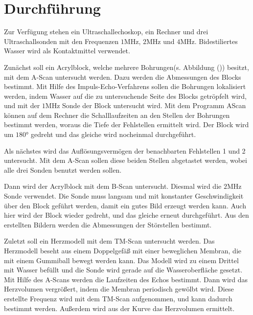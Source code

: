 \section{Durchführung}
\label{sec:Durchführung}

Zur Verfügung stehen ein Ultraschallechoskop, ein Rechner und drei Ultraschallsonden mit den Frequenzen $1 \si{\mega\hertz}$, $2 \si{\mega\hertz}$ und $4 \si{\mega\hertz}$.
Bidestiliertes Wasser wird als Kontaktmittel verwendet. 

Zunächst soll ein Acrylblock, welche mehrere Bohrungen(s. Abbildung ()) besitzt, mit dem A-Scan untersucht werden. Dazu werden die Abmessungen des Blocks bestimmt.
Mit Hilfe des Impuls-Echo-Verfahrens sollen die Bohrungen lokalisiert werden, indem Wasser auf die zu untersuchende Seite des Blocks getröpfelt wird, und mit der $1 \si{\mega\hertz}$ Sonde der Block untersucht wird.
Mit dem Programm AScan können auf dem Rechner die Schalllaufzeiten an den Stellen der Bohrungen bestimmt werden, woraus die Tiefe der Fehlstellen ermittelt wird.
Der Block wird um $180°$ gedreht und das gleiche wird nocheinmal durchgeführt.

Als nächstes wird das Auflösungsvermögen der benachbarten Fehlstellen 1 und 2 untersucht. Mit dem A-Scan sollen diese beiden Stellen abgetastet werden, wobei alle drei Sonden benutzt werden sollen.

Dann wird der Acrylblock mit dem B-Scan untersucht. Diesmal wird die $2 \si{\mega\hertz}$ Sonde verwendet. Die Sonde muss langsam und mit konstanter Geschwindigkeit über den Block geführt werden, damit ein gutes Bild erzeugt werden kann.
Auch hier wird der Block wieder gedreht, und das gleiche erneut durchgeführt. Aus den erstellten Bildern werden die Abmessungen der Störstellen bestimmt.

Zuletzt soll ein Herzmodell mit dem TM-Scan untersucht werden. Das Herzmodell beseht aus einem Doppelgefäß mit einer beweglichen Membran, die mit einem Gummiball bewegt werden kann.
Das Modell wird zu einem Drittel mit Wasser befüllt und die Sonde wird gerade auf die Wasseroberfläche gesetzt. Mit Hilfe des A-Scans werden die Laufzeiten des Echos bestimmt.
Dann wird das Herzvolumen vergrößert, indem die Membran periodisch gewölbt wird.
Diese erstellte Frequenz wird mit dem TM-Scan aufgenommen, und kann dadurch bestimmt werden. Außerdem wird aus der Kurve das Herzvolumen ermittelt.